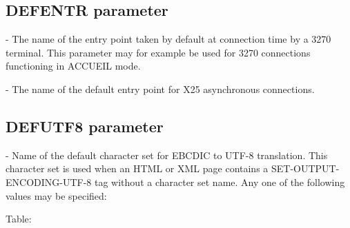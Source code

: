 \documentclass[letterpaper,10pt,english]{sphinxmanual}
\begin{document}
\ignorespaces 

\subsection{DEFENTR parameter}
\label{\detokenize{Installation_Guide:defentr-parameter}}\label{\detokenize{Installation_Guide:index-51}}
\begin{sphinxVerbatim}[commandchars=\\\{\}]
 
\end{sphinxVerbatim}

 - The name of the entry point taken by default at connection time by a 3270 terminal. This parameter may for example be used for 3270 connections functioning in ACCUEIL mode.

 - The name of the default entry point for X25 asynchronous connections.

\ignorespaces 

\subsection{DEFUTF8 parameter}
\label{\detokenize{Installation_Guide:defutf8-parameter}}\label{\detokenize{Installation_Guide:index-52}}
\begin{sphinxVerbatim}[commandchars=\\\{\}]
 
\end{sphinxVerbatim}

 - Name of the default character set for EBCDIC to UTF-8 translation. This character set is used when an HTML or XML page contains a SET-OUTPUT-ENCODING-UTF-8 tag without a character set name. Any one of the following values may be specified:

Table:
\end{document}
